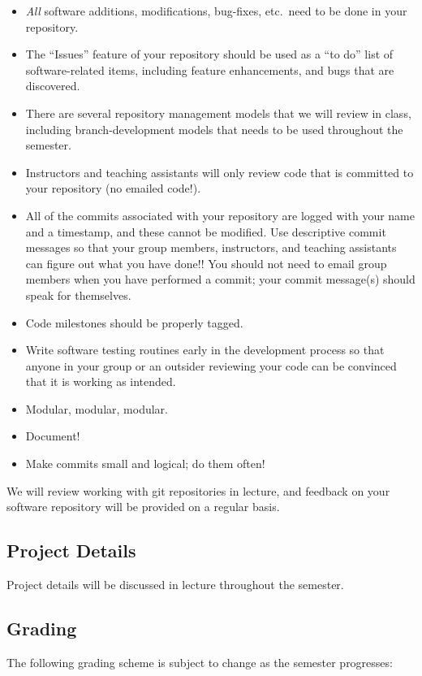 \begin{itemize}
    \item \emph{All} software additions, modifications, bug-fixes, etc.\ need
        to be done in your repository.
    \item The ``Issues'' feature of your repository should be used as a ``to
        do'' list of software-related items, including feature enhancements,
        and bugs that are discovered.
    \item There are several repository management models that we will review in class,
        including branch-development models that needs to be used throughout the semester.
    \item Instructors and teaching assistants will only review code that is committed to your repository (no emailed code!).  
    \item All of the commits associated with your repository are logged with
        your name and a timestamp, and these cannot be modified.  Use
        descriptive commit messages so that your group members, instructors,
        and teaching assistants can figure out what you have done!!  You should not
        need to email group members when you have performed a commit; your
        commit message(s) should speak for themselves.
    \item Code milestones should be properly tagged.
    \item Write software testing routines early in the development process so
        that anyone in your group or an outsider reviewing your code can be
        convinced that it is working as intended.
    \item Modular, modular, modular.
    \item Document!
    \item Make commits small and logical; do them often!
\end{itemize}

We will review working with git repositories in lecture, and feedback
on your software repository will be provided on a regular basis.

\subsection*{Project Details} 
Project details will be discussed in lecture throughout the semester.

\subsection*{Grading} 
The following grading scheme is subject to change as the semester progresses:

